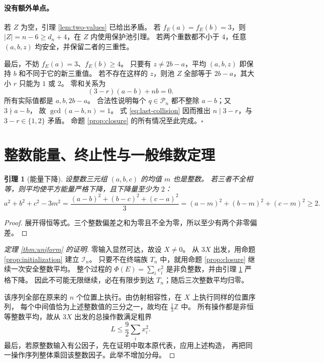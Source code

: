 \documentclass[UTF8,fontset=fandol,zihao=-4,a4paper]{ctexart}
\numberwithin{equation}{section}
\newtheorem{lemma}[theorem]{引理}
\theoremstyle{definition}
\newcommand{\Z}{\mathbb Z}
\newcommand{\PP}{\mathcal P}
\newcommand{\II}{\mathcal I}
\begin{document}
\paragraph{没有额外单点。}
若 $Z$ 为空，引理 \ref{lem:two-values} 已给出矛盾。
若 $f_E(a)=f_E(b)=3$，则 $|Z|=n-6\ge d_n+4$，在 $Z$ 内使用保护池引理。
若两个重数都不小于 $4$，任意 $(a,b,z)$ 均安全，并保留二者的三重性。

最后，不妨 $f_E(a)=3$、$f_E(b)\ge4$。
只要有 $z\ne2b-a$，平均 $(a,b,z)$ 即保持 $b$ 和不同于它的新三重值。
若不存在这样的 $z$，则池 $Z$ 全部等于 $2b-a$，其大小 $r$ 只能为 $1$ 或 $2$。
零和关系为
\begin{equation}\label{eq:last-collision}
 (3-r)(a-b)+nb=0.
\end{equation}
所有实际值都是 $a,b,2b-a$。
合法性说明每个 $q\in\PP_n$ 都不整除 $a-b$；又 $3\nmid a-b$，
故 $\gcd(a-b,n)=1$。
式 \eqref{eq:last-collision} 因而推出 $n\mid3-r$，与 $3-r\in\{1,2\}$ 矛盾。
命题 \ref{prop:closure} 的所有情况至此完成。\hfill$\square$

\section{整数能量、终止性与一般维数定理}\label{sec:termination}

\begin{lemma}[能量下降]\label{lem:energy}
设整数三元组 $(a,b,c)$ 的均值 $m$ 也是整数。
若三者不全相等，则平均使平方能量严格下降，且下降量至少为 $2$：
\begin{equation}\label{eq:energy}
 a^2+b^2+c^2-3m^2
 =\frac{(a-b)^2+(b-c)^2+(c-a)^2}{3}
 =(a-m)^2+(b-m)^2+(c-m)^2\ge2.
\end{equation}
\end{lemma}
\begin{proof}
展开得恒等式。三个整数偏差之和为零且不全为零，所以至少有两个非零偏差。
\end{proof}

\begin{proof}[定理 \ref{thm:uniform} 的证明]
零输入显然可达，故设 $X\ne0$。
从 $3X$ 出发，用命题 \ref{prop:initialization} 建立 $\II_n$。
只要不在终端族 $T_n$ 中，就用命题 \ref{prop:closure} 继续一次安全整数平均。
整个过程的
$\Phi(E)=\sum_i e_i^2$ 是非负整数，并由引理 \ref{lem:energy} 严格下降。
因此不可能无限继续，必在有限步到达 $T_n$；随后三次整数平均归零。

该序列全部在原来的 $n$ 个位置上执行。由仿射相容性，在 $X$ 上执行同样的位置序列，
每个中间值恰为上述整数值的三分之一，故均在 $\frac13\Z$ 中。
所有操作都是非恒等整数平均，故从 $3X$ 出发的总操作数满足粗界
\begin{equation}\label{eq:length}
 L\le\frac92\sum_i x_i^2.
\end{equation}
最后，若原整数输入有公因子，先在证明中取本原代表，应用上述构造，
再把同一操作序列整体乘回该整数因子。此举不增加分母。
\end{proof}
\end{document}
